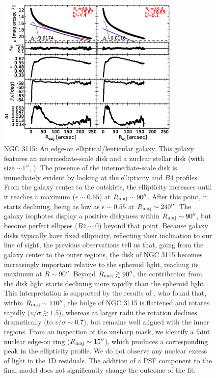 \documentclass[preprint2]{emulateapj}
\newcommand{\fitfigurewidth}{0.8\textwidth}
\begin{document}
  \begin{figure}[h]
  \begin{center}
  \includegraphics[width=\fitfigurewidth]{n3115_1Dfit.eps}
  \caption{NGC 3115:
  An edge-on elliptical/lenticular galaxy. 
  This galaxy features an intermediate-scale disk and a nuclear stellar disk (with size $\sim 1''$, \citealt{scorzabender1995,ledo2010}).
  The presence of the intermediate-scale disk 
  is immediately evident by looking at the ellipticity and $B4$ profiles.
  From the galaxy center to the outskirts, the ellipticity increases until it reaches a maximum 
  ($\epsilon \sim 0.65$) at $R_{\rm maj} \sim 90''$. 
  After this point, it starts declining, being as low as $\epsilon \sim 0.55$ at $R_{\rm maj} \sim 240''$. 
  The galaxy isophotes display a positive diskyness within $R_{\rm maj} \sim 90''$, but become perfect ellipses 
  ($B4 \sim 0$) beyond that point.
  Because galaxy disks typically have fixed ellipticity, reflecting their inclination to our line of sight,
  the previous observations tell us that, going from the galaxy center to the outer regions,
  the disk of NGC 3115 becomes increasingly important relative to the spheroid light, reaching its maximum at $R \sim 90''$.
  Beyond $R_{\rm maj} \gtrsim 90''$, the contribution from the disk light starts declining more rapidly than the spheroid light.
  This interpretation is supported by the results of \cite{arnold2011n3115},
  who found that, within $R_{\rm maj} \sim 110''$, the bulge of NGC 3115 is flattened and rotates rapidly ($v/\sigma \gtrsim 1.5$),
  whereas at larger radii the rotation declines dramatically (to $v/\sigma \sim 0.7$), 
  but remains well aligned with the inner regions. 
  From an inspection of the unsharp mask, we identify a faint nuclear edge-on ring ($R_{\rm maj} \sim 15''$), 
  which produces a corresponding peak in the ellipticity profile. 
  We do not observe any nuclear excess of light in the 1D residuals. 
  The addition of a PSF component to the final model does not significantly change the outcome of the fit. 
  }
  \end{center}
  \end{figure}
\end{document}
